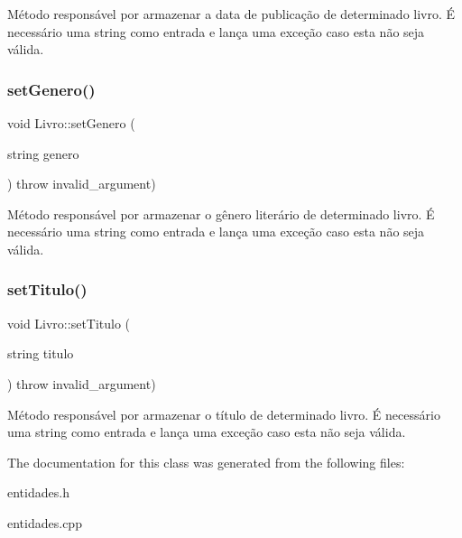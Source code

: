 Método responsável por armazenar a data de publicação de determinado livro. É necessário uma string como entrada e lança uma exceção caso esta não seja válida. \mbox{\label{classLivro_a780f063297948dfc6c20d564ed4a48c3}} 
\subsubsection{\texorpdfstring{set\+Genero()}{setGenero()}}
{\footnotesize\ttfamily void Livro\+::set\+Genero (\begin{DoxyParamCaption}\item[{string}]{genero }\end{DoxyParamCaption}) throw  invalid\+\_\+argument) }

Método responsável por armazenar o gênero literário de determinado livro. É necessário uma string como entrada e lança uma exceção caso esta não seja válida. \mbox{\label{classLivro_a9a33b5175b4b8666a3dc3ffbbb445b7e}} 
\subsubsection{\texorpdfstring{set\+Titulo()}{setTitulo()}}
{\footnotesize\ttfamily void Livro\+::set\+Titulo (\begin{DoxyParamCaption}\item[{string}]{titulo }\end{DoxyParamCaption}) throw  invalid\+\_\+argument) }

Método responsável por armazenar o título de determinado livro. É necessário uma string como entrada e lança uma exceção caso esta não seja válida. 

The documentation for this class was generated from the following files\+:\begin{DoxyCompactItemize}
\item 
entidades.\+h\item 
entidades.\+cpp\end{DoxyCompactItemize}
